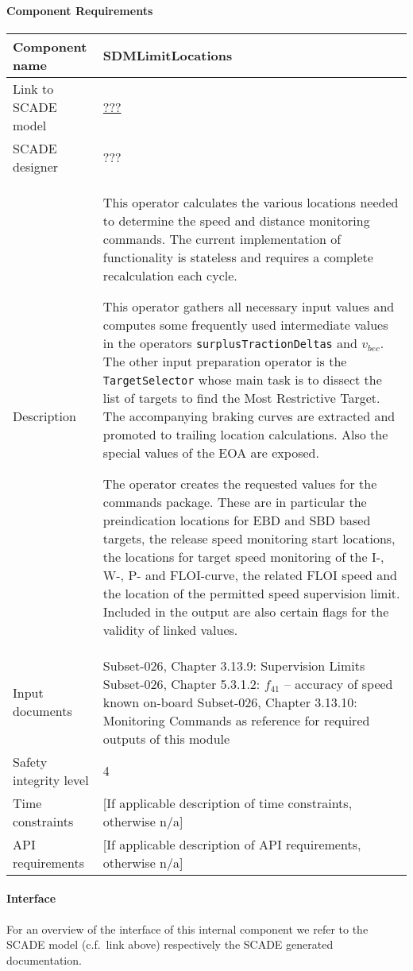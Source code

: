 
\paragraph{Component Requirements}

\begin{longtable}{p{}p{}}
\toprule
Component name			& SDMLimitLocations \\
\midrule
Link to SCADE model		& {\footnotesize \url{???}} \\
\midrule
SCADE designer			& ??? \\
\midrule
Description				& This operator calculates the various locations needed to determine the speed and distance monitoring commands. The current implementation of functionality is stateless and requires a complete recalculation each cycle. 

This operator gathers all necessary input values and computes some frequently used intermediate values in the operators \texttt{surplusTractionDeltas} and \texttt{$v_{\mathit{bec}}$}. The other input preparation operator is the \texttt{TargetSelector} whose main task is to dissect the list of targets to find the Most Restrictive Target. The accompanying braking curves are extracted and promoted to trailing location calculations. Also the special values of the EOA are exposed.

The operator creates the requested values for the commands package. These are in particular the preindication locations for EBD and SBD based targets, the release speed monitoring start locations, the locations for target speed monitoring of the I-, W-, P- and FLOI-curve, the related FLOI speed and the location of the permitted speed supervision limit. Included in the output are also certain flags for the validity of linked values.\\
\midrule
Input documents	& 
Subset-026, Chapter 3.13.9: Supervision Limits \newline
Subset-026, Chapter 5.3.1.2: $f_{41}$ -- accuracy of speed known on-board\newline
Subset-026, Chapter 3.13.10: Monitoring Commands as reference for required outputs of this module \\
\midrule
Safety integrity level		& 4 \\
\midrule
Time constraints		& [If applicable description of time constraints, otherwise n/a] \\
\midrule
API requirements 		& [If applicable description of API requirements, otherwise n/a] \\
\bottomrule
\end{longtable}


\paragraph{Interface}

For an overview of the interface of this internal component we refer to the SCADE model (c.f.~link above) respectively the SCADE generated documentation.